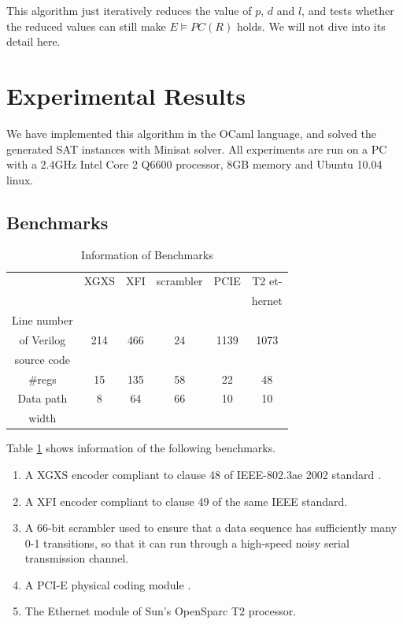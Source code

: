 \documentclass{sig-alternate}
\begin{document}
This algorithm just iteratively reduces the value of $p$, $d$ and $l$,
and tests whether the reduced values can still make $E\vDash PC(R)$ holds.
We will not dive into its detail here.


\section{Experimental Results}\label{sec_exp}
We have implemented this algorithm in the OCaml language,
and solved the generated SAT instances with Minisat solver\cite{EXTSAT}.
All experiments are run on a PC with a 2.4GHz Intel Core 2 Q6600 processor, 8GB memory and Ubuntu 10.04 linux.
\subsection{Benchmarks}

\begin{table}[b]
\centering
\caption{Information of Benchmarks}
\begin{tabular}{|c|c|c|c|c|c|}
\hline
&XGXS&XFI&scrambler&PCIE&T2 et-\\
&&&&&hernet\\\hline
Line number&&&&&\\
of Verilog&214&466&24&1139&1073\\
source code&&&&&\\\hline
\#regs&15&135&58&22&48\\\hline
Data path&8&64&66&10&10\\
width&&&&&\\ \hline
\end{tabular}\label{tab_benchmark}
\end{table}




Table \ref{tab_benchmark} shows information of the following benchmarks.
\begin{enumerate}

\item A XGXS encoder compliant to clause 48 of IEEE-802.3ae 2002 standard \cite{IEEE80232002}.

\item A XFI encoder compliant to clause 49 of the same IEEE standard.

\item A 66-bit scrambler used to ensure
that a data sequence has sufficiently many 0-1 transitions, 
so that it can run through a high-speed
noisy serial transmission channel.

\item A PCI-E physical coding module \cite{PCIESPEC}.

\item The Ethernet module of Sun's OpenSparc T2 processor.
\end{enumerate}
\end{document}
